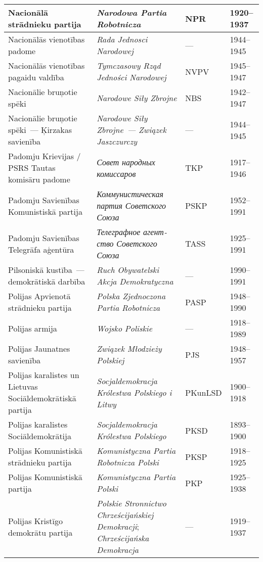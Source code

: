 \documentclass[twoside,a5paper,12pt,fleqn,openany]{extbook}
\newcommand{\pltxti}[1]{\textit{\textpolish{#1}}}
\newcommand{\rutxti}[1]{\textit{\textrussian{#1}}}
\begin{document}
\begin{footnotesize}
\begin{tabularx}{\linewidth}{|p{3cm}|p{3.5cm}|p{1.4cm}|p{1.6cm}|}
\hline
Nacionālā strādnieku partija & \pltxti{Narodowa Partia Robotnicza} & NPR & 1920--1937 \\
\hline
Nacionālās vienotības padome & \pltxti{Rada Jednosci Narodowej} & --- & 1944--1945 \\
\hline
Nacionālās vienotības pagaidu valdība & \pltxti{Tymczasowy Rząd Jedności Narodowej} & NVPV & 1945--1947 \\
\hline
Nacionālie bruņotie spēki & \pltxti{Narodowe Siły Zbrojne} & NBS & 1942--1947 \\
\hline
Nacionālie bruņotie spēki~--- Ķirzakas savienība & \pltxti{Narodowe Siły Zbrojne~--- Związek Jaszczurczy} & --- & 1944--1945 \\
\hline
Padomju Krievijas / PSRS Tautas komisāru padome & \rutxti{Совет народных комиссаров} & TKP & 1917--1946 \\
\hline
Padomju Savienības Komunistiskā partija & \rutxti{Коммунистическая партия Советского Союза} & PSKP & 1952--1991 \\
\hline
Padomju Savienības Telegrāfa aģentūra & \rutxti{Телеграфное агентство Советского Союза} & TASS & 1925--1991 \\
\hline
Pilsoniskā kustība~--- demokrātiskā darbība & \pltxti{Ruch Obywatelski Akcja Demokratyczna} & --- & 1990--1991 \\
\hline
Polijas Apvienotā strādnieku partija & \pltxti{Polska Zjednoczona Partia Robotnicza} & PASP & 1948--1990 \\
\hline
Polijas armija & \pltxti{Wojsko Poliskie} & --- & 1918--1989 \\
\hline
Polijas Jaunatnes savienība & \pltxti{Związek Młodzieży Polskiej} & PJS & 1948--1957 \\
\hline
Polijas karalistes un Lietuvas Sociāldemokrātiskā partija & \pltxti{Socjaldemokracja Królestwa Polskiego i Litwy} & PKunLSD & 1900--1918 \\
\hline
Polijas karalistes Sociāldemokrātija & \pltxti{Socjaldemokracja Królestwa Polskiego} & PKSD & 1893--1900 \\
\hline
Polijas Komunistiskā strādnieku partija & \pltxti{Komunistyczna Partia Robotnicza Polski} & PKSP & 1918--1925 \\
\hline
Polijas Komunistiskā partija & \pltxti{Komunistyczna Partia Polski} & PKP & 1925--1938 \\
\hline
Polijas Kristīgo demokrātu partija & \pltxti{Polskie Stronnictwo Chrześcijańskiej Demokracji}; \pltxti{Chrześcijańska Demokracja} & --- & 1919--1937 \\

\end{tabularx}
\end{footnotesize}
\end{document}
